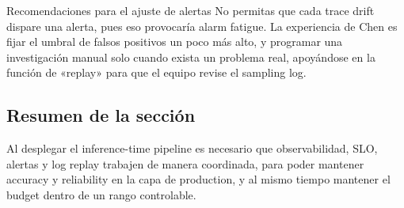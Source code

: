 \begin{warningbox}{Recomendaciones para el ajuste de alertas}
No permitas que cada trace drift dispare una alerta, pues eso provocaría alarm fatigue. La experiencia de Chen es fijar el umbral de falsos positivos un poco más alto, y programar una investigación manual solo cuando exista un problema real, apoyándose en la función de «replay» para que el equipo revise el sampling log.
\end{warningbox}

\subsection{Resumen de la sección}
Al desplegar el inference-time pipeline es necesario que observabilidad, SLO, alertas y log replay trabajen de manera coordinada, para poder mantener accuracy y reliability en la capa de production, y al mismo tiempo mantener el budget dentro de un rango controlable.

